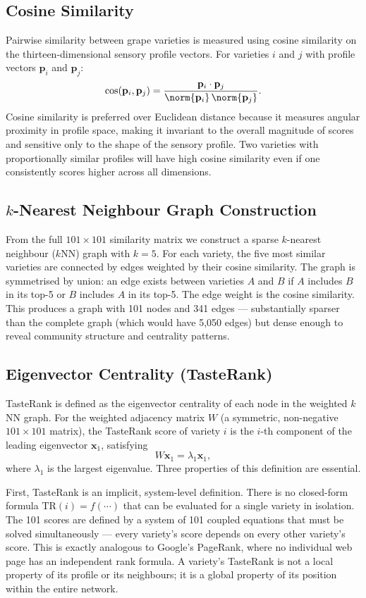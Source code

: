 \documentclass[11pt]{article}
\begin{document}
\subsection{Cosine Similarity}
Pairwise similarity between grape varieties is measured using cosine similarity on the thirteen-dimensional sensory profile vectors. For varieties $i$ and $j$ with profile vectors $\mathbf{p}_i$ and $\mathbf{p}_j$:
\[
\cos(\mathbf{p}_i, \mathbf{p}_j) = \frac{\mathbf{p}_i \cdot \mathbf{p}_j}{\norm{\mathbf{p}_i}\,\norm{\mathbf{p}_j}}.
\]
Cosine similarity is preferred over Euclidean distance because it measures angular proximity in profile space, making it invariant to the overall magnitude of scores and sensitive only to the shape of the sensory profile. Two varieties with proportionally similar profiles will have high cosine similarity even if one consistently scores higher across all dimensions.

\subsection{$k$-Nearest Neighbour Graph Construction}
From the full $101 \times 101$ similarity matrix we construct a sparse $k$-nearest neighbour ($k$NN) graph with $k = 5$. For each variety, the five most similar varieties are connected by edges weighted by their cosine similarity. The graph is symmetrised by union: an edge exists between varieties $A$ and $B$ if $A$ includes $B$ in its top-5 or $B$ includes $A$ in its top-5. The edge weight is the cosine similarity. This produces a graph with 101 nodes and 341 edges --- substantially sparser than the complete graph (which would have 5{,}050 edges) but dense enough to reveal community structure and centrality patterns.

\subsection{Eigenvector Centrality (TasteRank)}
TasteRank is defined as the eigenvector centrality of each node in the weighted $k$NN graph. For the weighted adjacency matrix $W$ (a symmetric, non-negative $101 \times 101$ matrix), the TasteRank score of variety $i$ is the $i$-th component of the leading eigenvector $\mathbf{x}_1$, satisfying
\[
W \mathbf{x}_1 = \lambda_1 \mathbf{x}_1,
\]
where $\lambda_1$ is the largest eigenvalue. Three properties of this definition are essential.

First, TasteRank is an implicit, system-level definition. There is no closed-form formula $\mathrm{TR}(i) = f(\cdots)$ that can be evaluated for a single variety in isolation. The 101 scores are defined by a system of 101 coupled equations that must be solved simultaneously --- every variety's score depends on every other variety's score. This is exactly analogous to Google's PageRank, where no individual web page has an independent rank formula. A variety's TasteRank is not a local property of its profile or its neighbours; it is a global property of its position within the entire network.
\end{document}
